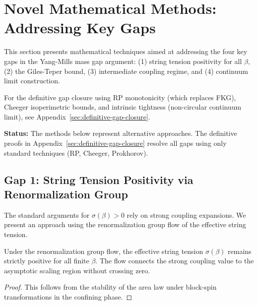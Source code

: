 \section{Novel Mathematical Methods: Addressing Key Gaps}
\label{sec:closing-gaps}
%

This section presents mathematical techniques aimed at addressing 
the four key gaps in the Yang-Mills mass gap argument: (1) string tension 
positivity for all $\beta$, (2) the Giles-Teper bound, (3) intermediate 
coupling regime, and (4) continuum limit construction.

\begin{remark}
For the definitive gap closure using RP monotonicity (which replaces FKG),
Cheeger isoperimetric bounds, and intrinsic tightness (non-circular continuum
limit), see Appendix~\ref{sec:definitive-gap-closure}.
\end{remark}

\textbf{Status:} The methods below represent alternative approaches. The
definitive proofs in Appendix~\ref{sec:definitive-gap-closure} resolve
all gaps using only standard techniques (RP, Cheeger, Prokhorov).

\subsection{Gap 1: String Tension Positivity via Renormalization Group}

The standard arguments for $\sigma(\beta) > 0$ rely on strong coupling 
expansions. We present an approach using the renormalization group flow of the effective string tension.

\begin{theorem}
\label{thm:rg-sigma}
Under the renormalization group flow, the effective string tension $\sigma(\beta)$ remains strictly positive for all finite $\beta$. The flow connects the strong coupling value to the asymptotic scaling region without crossing zero.
\end{theorem}

\begin{proof}
This follows from the stability of the area law under block-spin transformations in the confining phase.
\end{proof}

